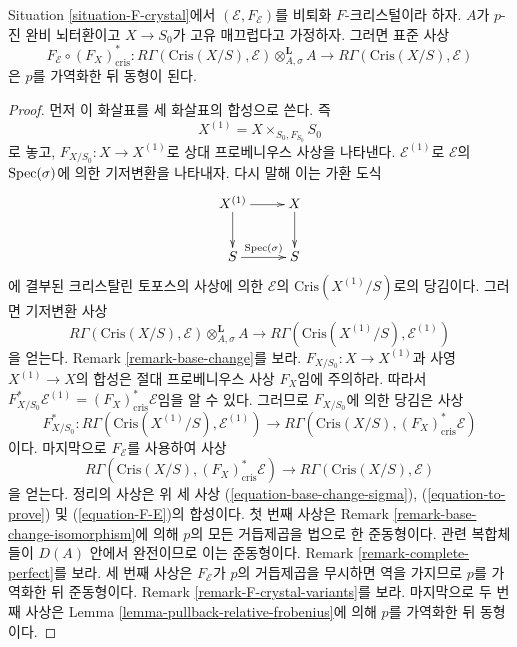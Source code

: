 \begin{theorem}
\label{theorem-cohomology-F-crystal}
Situation \ref{situation-F-crystal}에서
$(\mathcal{E}, F_\mathcal{E})$를 비퇴화 $F$-크리스털이라 하자.
$A$가 $p$-진 완비 뇌터환이고 $X \to S_0$가 고유 매끄럽다고
가정하자. 그러면 표준 사상
$$
F_\mathcal{E} \circ (F_X)_{\text{cris}}^* :
R\Gamma(\text{Cris}(X/S), \mathcal{E}) \otimes^\mathbf{L}_{A, \sigma} A
\longrightarrow
R\Gamma(\text{Cris}(X/S), \mathcal{E})
$$
은 $p$를 가역화한 뒤 동형이 된다.
\end{theorem}

\begin{proof}
먼저 이 화살표를 세 화살표의 합성으로 쓴다. 즉
$$
X^{(1)} = X \times_{S_0, F_{S_0}} S_0
$$
로 놓고, $F_{X/S_0} : X \to X^{(1)}$로 상대 프로베니우스 사상을
나타낸다. $\mathcal{E}^{(1)}$로 $\mathcal{E}$의
$\mathop{\mathrm{Spec}}(\sigma)$에 의한 기저변환을 나타내자. 다시 말해 이는 가환 도식
$$
\xymatrix{
X^{(1)} \ar[r] \ar[d] & X \ar[d] \\
S \ar[r]^{\Spec(\sigma)} & S
}
$$
에 결부된 크리스탈린 토포스의 사상에 의한 $\mathcal{E}$의
$\text{Cris}(X^{(1)}/S)$로의 당김이다. 그러면 기저변환 사상
\begin{equation}
\label{equation-base-change-sigma}
R\Gamma(\text{Cris}(X/S), \mathcal{E}) \otimes^\mathbf{L}_{A, \sigma} A
\longrightarrow
R\Gamma(\text{Cris}(X^{(1)}/S), \mathcal{E}^{(1)})
\end{equation}
을 얻는다. Remark \ref{remark-base-change}를 보라.
$F_{X/S_0} : X \to X^{(1)}$과 사영 $X^{(1)} \to X$의 합성은
절대 프로베니우스 사상 $F_X$임에 주의하라. 따라서
$F_{X/S_0}^*\mathcal{E}^{(1)} = (F_X)_{\text{cris}}^*\mathcal{E}$임을
알 수 있다. 그러므로 $F_{X/S_0}$에 의한 당김은 사상
\begin{equation}
\label{equation-to-prove}
F_{X/S_0}^* :
R\Gamma(\text{Cris}(X^{(1)}/S), \mathcal{E}^{(1)})
\longrightarrow
R\Gamma(\text{Cris}(X/S), (F_X)^*_{\text{cris}}\mathcal{E})
\end{equation}
이다. 마지막으로 $F_\mathcal{E}$를 사용하여 사상
\begin{equation}
\label{equation-F-E}
R\Gamma(\text{Cris}(X/S), (F_X)^*_{\text{cris}}\mathcal{E})
\longrightarrow
R\Gamma(\text{Cris}(X/S), \mathcal{E})
\end{equation}
을 얻는다. 정리의 사상은 위 세 사상
(\ref{equation-base-change-sigma}), (\ref{equation-to-prove}) 및
(\ref{equation-F-E})의 합성이다. 첫 번째 사상은 Remark
\ref{remark-base-change-isomorphism}에 의해 $p$의 모든 거듭제곱을
법으로 한 준동형이다. 관련 복합체들이 $D(A)$ 안에서 완전이므로 이는
준동형이다. Remark \ref{remark-complete-perfect}를 보라. 세 번째
사상은 $F_\mathcal{E}$가 $p$의 거듭제곱을 무시하면 역을 가지므로
$p$를 가역화한 뒤 준동형이다. Remark
\ref{remark-F-crystal-variants}를 보라. 마지막으로 두 번째 사상은
Lemma \ref{lemma-pullback-relative-frobenius}에 의해 $p$를 가역화한 뒤
동형이다.
\end{proof}













